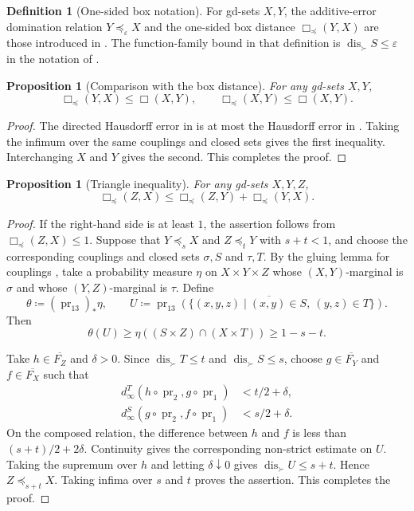 \documentclass{amsart}
\theoremstyle{plain}
\newtheorem{proposition}[theorem]{Proposition}
\theoremstyle{definition}
\newtheorem{definition}[theorem]{Definition}
\theoremstyle{remark}
\DeclareMathOperator{\dis}{dis}
\DeclareMathOperator{\pr}{pr}
\newcommand{\dinf}[1]{d^{#1}_{\infty}}
\begin{document}
\begin{definition}[One-sided box notation]
\label{def:additive-error-domination}
For gd-sets $X,Y$, the additive-error domination relation
$Y\preceq_\varepsilon X$ and the one-sided box distance
$\Box_{\preceq}(Y,X)$ are those introduced in
.  The function-family
bound in that definition is $\dis_{\succ}S\leq\varepsilon$ in the notation of
.
\end{definition}

\begin{proposition}[Comparison with the box distance]
\label{prop:unilateral-box-comparison}
For any gd-sets $X,Y$,
\[ \Box_{\preceq}(Y,X)\leq\Box(X,Y),\qquad \Box_{\preceq}(X,Y)\leq\Box(X,Y). \]
\end{proposition}

\begin{proof}
The directed Hausdorff error in  is at
most the Hausdorff error in .  Taking the infimum over the
same couplings and closed sets gives the first inequality.  Interchanging
$X$ and $Y$ gives the second.
	This completes the proof.
\end{proof}

\begin{proposition}[Triangle inequality]
\label{prop:unilateral-box-triangle}
For any gd-sets $X,Y,Z$,
\[ \Box_{\preceq}(Z,X)\leq \Box_{\preceq}(Z,Y)+\Box_{\preceq}(Y,X). \]
\end{proposition}

\begin{proof}
If the right-hand side is at least $1$, the assertion follows from
$\Box_{\preceq}(Z,X)\leq1$.  Suppose that $Y\preceq_sX$ and
$Z\preceq_tY$ with $s+t<1$, and choose the corresponding couplings and
closed sets $\sigma,S$ and $\tau,T$.  By the gluing lemma for couplings
\cite{villani2009optimal}, take a probability measure $\eta$ on
$X\times Y\times Z$ whose $(X,Y)$-marginal is $\sigma$ and whose
$(Y,Z)$-marginal is $\tau$.  Define
\[
\theta\coloneqq(\pr_{13})_*\eta,\qquad
U\coloneqq\overline{\pr_{13}
(\{(x,y,z)\mid(x,y)\in S,\ (y,z)\in T\})}.
\]
Then
\[
\theta(U)\geq\eta((S\times Z)\cap(X\times T))\geq1-s-t.
\]

Take $h\in\overline{F_Z}$ and $\delta>0$.  Since
$\dis_{\succ}T\leq t$ and $\dis_{\succ}S\leq s$, choose
$g\in\overline{F_Y}$ and $f\in\overline{F_X}$ such that
\begin{align*}
\dinf{T}(h\circ\pr_2,g\circ\pr_1)&<t/2+\delta,\\
\dinf{S}(g\circ\pr_2,f\circ\pr_1)&<s/2+\delta.
\end{align*}
On the composed relation, the difference between $h$ and $f$ is less than
$(s+t)/2+2\delta$.  Continuity gives the corresponding non-strict estimate
on $U$.  Taking the supremum over $h$ and letting $\delta\downarrow0$ gives
$\dis_{\succ}U\leq s+t$.  Hence $Z\preceq_{s+t}X$.  Taking infima over
$s$ and $t$ proves the assertion.  This completes the proof.
\end{proof}
\end{document}
